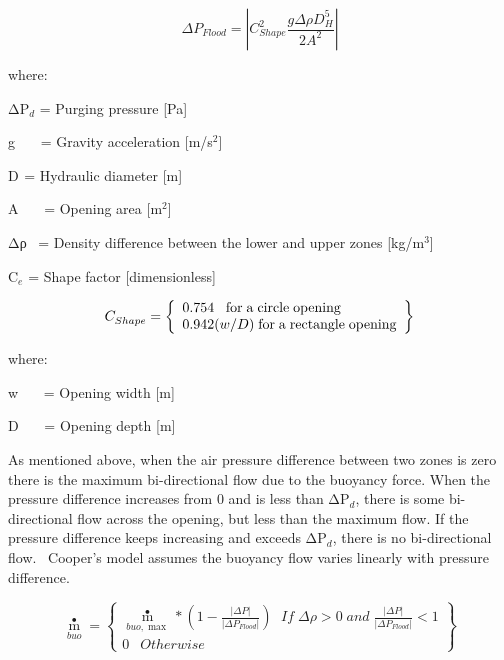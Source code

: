 \begin{equation}
\Delta {P_{Flood}} = \left| {C_{Shape}^2\frac{{g\Delta \rho D_H^5}}{{2{A^2}}}} \right|
\end{equation}

where:

ΔP\(_{d}\) = Purging pressure {[}Pa{]}

g~~~ = Gravity acceleration {[}m/s\(^{2}\){]}

D\(_{ }\) = Hydraulic diameter {[}m{]}

A~~~ = Opening area {[}m\(^{2}\){]}

Δρ~ = Density difference between the lower and upper zones {[}kg/m\(^{3}\){]}

C\(_{e}\) = Shape factor {[}dimensionless{]}

\begin{equation}
C_{Shape}^{} = \left\{ \begin{array}{l}0.754\;\;\;{\rm{for}}\;{\rm{a}}\;{\rm{circle}}\;{\rm{opening}}\\0.942(w/D)\;{\rm{for}}\;{\rm{a}}\;{\rm{rectangle}}\;{\rm{opening}}\end{array} \right\}
\end{equation}

where:

w~~~ = Opening width {[}m{]}

D~~~ = Opening depth {[}m{]}

As mentioned above, when the air pressure difference between two zones is zero there is the maximum bi-directional flow due to the buoyancy force. When the pressure difference increases from 0 and is less than \textbar{}ΔP\(_{d}\)\textbar{}, there is some bi-directional flow across the opening, but less than the maximum flow. If the pressure difference keeps increasing and exceeds \textbar{}ΔP\(_{d}\)\textbar{}, there is no bi-directional flow.~ Cooper's model assumes the buoyancy flow varies linearly with pressure difference.

\begin{equation}
{\mathop m\limits^ \bullet_{buo}} = \left\{ \begin{array}{l}{\mathop m\limits^ \bullet_{buo,\max }}*\left( {1 - \frac{{\left| {\Delta P} \right|}}{{\left| {\Delta {P_{Flood}}} \right|}}} \right)\;\,\,If\;\Delta \rho  > 0\;and\;\frac{{\left| {\Delta P} \right|}}{{\left| {\Delta {P_{Flood}}} \right|}} < 1\\0\;\,\,\,Otherwise\end{array} \right\}
\end{equation}

